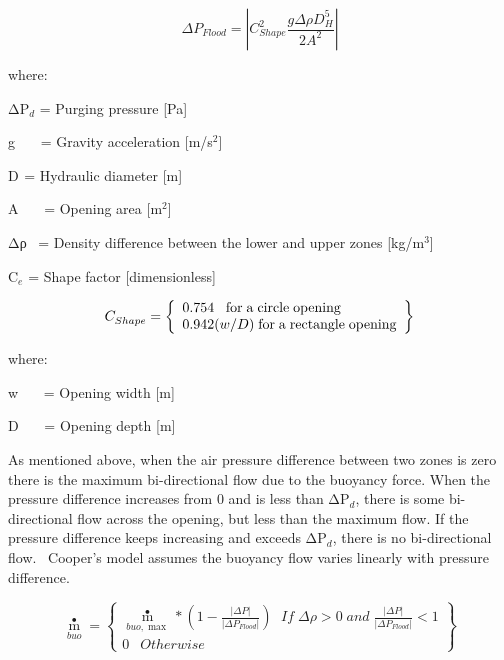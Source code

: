 \begin{equation}
\Delta {P_{Flood}} = \left| {C_{Shape}^2\frac{{g\Delta \rho D_H^5}}{{2{A^2}}}} \right|
\end{equation}

where:

ΔP\(_{d}\) = Purging pressure {[}Pa{]}

g~~~ = Gravity acceleration {[}m/s\(^{2}\){]}

D\(_{ }\) = Hydraulic diameter {[}m{]}

A~~~ = Opening area {[}m\(^{2}\){]}

Δρ~ = Density difference between the lower and upper zones {[}kg/m\(^{3}\){]}

C\(_{e}\) = Shape factor {[}dimensionless{]}

\begin{equation}
C_{Shape}^{} = \left\{ \begin{array}{l}0.754\;\;\;{\rm{for}}\;{\rm{a}}\;{\rm{circle}}\;{\rm{opening}}\\0.942(w/D)\;{\rm{for}}\;{\rm{a}}\;{\rm{rectangle}}\;{\rm{opening}}\end{array} \right\}
\end{equation}

where:

w~~~ = Opening width {[}m{]}

D~~~ = Opening depth {[}m{]}

As mentioned above, when the air pressure difference between two zones is zero there is the maximum bi-directional flow due to the buoyancy force. When the pressure difference increases from 0 and is less than \textbar{}ΔP\(_{d}\)\textbar{}, there is some bi-directional flow across the opening, but less than the maximum flow. If the pressure difference keeps increasing and exceeds \textbar{}ΔP\(_{d}\)\textbar{}, there is no bi-directional flow.~ Cooper's model assumes the buoyancy flow varies linearly with pressure difference.

\begin{equation}
{\mathop m\limits^ \bullet_{buo}} = \left\{ \begin{array}{l}{\mathop m\limits^ \bullet_{buo,\max }}*\left( {1 - \frac{{\left| {\Delta P} \right|}}{{\left| {\Delta {P_{Flood}}} \right|}}} \right)\;\,\,If\;\Delta \rho  > 0\;and\;\frac{{\left| {\Delta P} \right|}}{{\left| {\Delta {P_{Flood}}} \right|}} < 1\\0\;\,\,\,Otherwise\end{array} \right\}
\end{equation}

